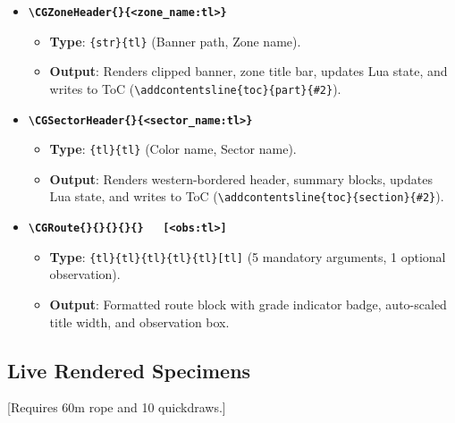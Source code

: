 \begin{sloppypar}
{\begin{itemize}
    \item \textbf{\texttt{\textbackslash CGZoneHeader\{<image:str>\}\{<zone\_name:tl>\}}}
    \begin{itemize}
        \item \textbf{Type}: \texttt{\{str\}\{tl\}} (Banner path, Zone name).
        \item \textbf{Output}: Renders clipped banner, zone title bar, updates Lua state, and writes to ToC (\texttt{\textbackslash addcontentsline\{toc\}\{part\}\{\#2\}}).
    \end{itemize}

    \item \textbf{\texttt{\textbackslash CGSectorHeader\{<color:tl>\}\{<sector\_name:tl>\}}}
    \begin{itemize}
        \item \textbf{Type}: \texttt{\{tl\}\{tl\}} (Color name, Sector name).
        \item \textbf{Output}: Renders western-bordered header, summary blocks, updates Lua state, and writes to ToC (\texttt{\textbackslash addcontentsline\{toc\}\{section\}\{\#2\}}).
    \end{itemize}

    \item \textbf{\texttt{\textbackslash CGRoute\{<name:tl>\}\{<grade:tl>\}\{<len:tl>\}\{<gear:tl>\}\{<setter:tl>\}~\linebreak~
    [<obs:tl>]}}
    \begin{itemize}
        \item \textbf{Type}: \texttt{\{tl\}\{tl\}\{tl\}\{tl\}\{tl\}[tl]} (5 mandatory arguments, 1 optional observation).
        \item \textbf{Output}: Formatted route block with grade indicator badge, auto-scaled title width, and observation box.
    \end{itemize}
\end{itemize}
}
\end{sloppypar}

\subsection{Live Rendered Specimens}



\vspace{0.5em}\noindent
{}%
%
%
%
%
%

\vspace{0.5em}
[Requires 60m rope and 10 quickdraws.]
